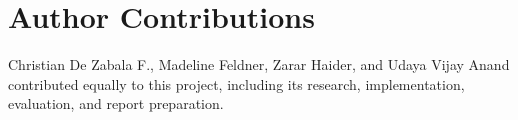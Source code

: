 \section*{Author Contributions}
Christian De Zabala F., Madeline Feldner, Zarar Haider, and Udaya Vijay Anand
contributed equally to this project, including its research, implementation,
evaluation, and report preparation.
